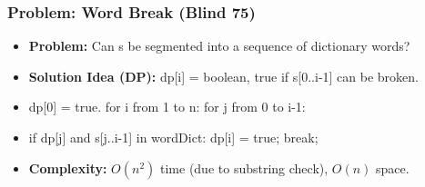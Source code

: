 \subsubsection{Problem: Word Break (Blind 75)}
\begin{itemize}
\item \textbf{Problem:} Can s be segmented into a sequence of dictionary words?
\item \textbf{Solution Idea (DP):} dp[i] = boolean, true if s[0..i-1] can be broken.
\item dp[0] = true. for i from 1 to n: for j from 0 to i-1:
\item if dp[j] and s[j..i-1] in wordDict: dp[i] = true; break;
\item \textbf{Complexity:} $O(n^2)$ time (due to substring check), $O(n)$ space.
\end{itemize}